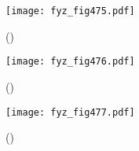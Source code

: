 {    \begin{figure}[ht!] %
      \centering
      \texttt{[image: fyz\_fig475.pdf]}
      \caption{ 
               (\cite[s.~707]{Feynman01})}
      \label{fyz_fig475}
    \end{figure}

    \begin{figure}[ht!] %
      \centering
      \texttt{[image: fyz\_fig476.pdf]}
      \caption{ 
               (\cite[s.~707]{Feynman01})}
      \label{fyz_fig476}
    \end{figure}

    \begin{figure}[ht!] %
      \centering
      \texttt{[image: fyz\_fig477.pdf]}
      \caption{ 
               (\cite[s.~707]{Feynman01})}
      \label{fyz_fig477}
    \end{figure}
  
} %
\printbibliography[title={Seznam literatury}, heading=subbibliography]
